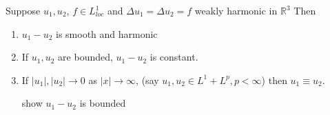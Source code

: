 \documentclass[11pt]{article}
\begin{document}
\begin{proposition}
    Suppose $u_1, u_2$, $f \in L_{loc}^{1}$ and $\Delta u_1 = \Delta u_2 = f$ weakly harmonic in $\mathbb{R}^{3}$
    Then
    \begin{enumerate}
        \item $u_1 - u_2$ is smooth and harmonic 
        \item If $u_1,u_2$ are bounded, $u_1-u_2$ is constant.
        \item If $|u_1|, |u_2| \longrightarrow 0$ as $|x| \longrightarrow \infty$, (say $u_1,u_2 \in
        L^{1} + L^{p}, p < \infty$)
        then $u_1 \equiv u_2$.
        \begin{exercise}
            show $u_1 - u_2$ is bounded
        \end{exercise}
    \end{enumerate}
\end{proposition}


\,
\end{document}
